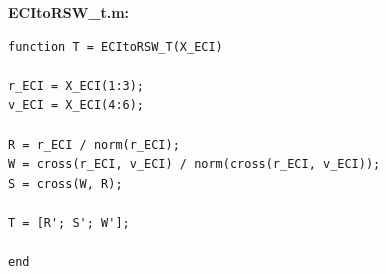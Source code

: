 \documentclass[conf]{new-aiaa}
\begin{document}
\textbf{ECItoRSW\_t.m:}
\begin{lstlisting}
function T = ECItoRSW_T(X_ECI)

r_ECI = X_ECI(1:3); 
v_ECI = X_ECI(4:6); 

R = r_ECI / norm(r_ECI); 
W = cross(r_ECI, v_ECI) / norm(cross(r_ECI, v_ECI)); 
S = cross(W, R); 

T = [R'; S'; W']; 

end 
\end{lstlisting}




\end{document}
